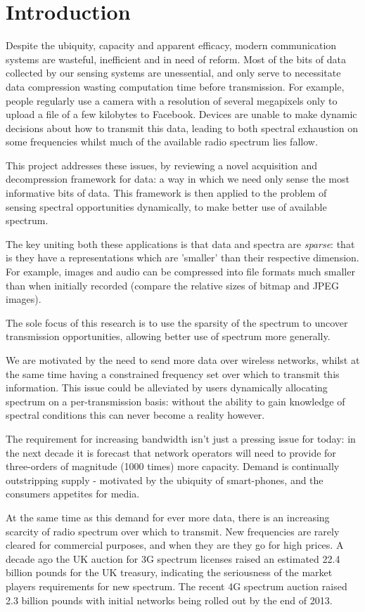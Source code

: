\section{Introduction}
Despite the ubiquity, capacity and apparent efficacy, modern communication systems are wasteful, inefficient and in need of reform. Most of the bits of data collected by our sensing systems are unessential, and only serve to necessitate data compression wasting computation time before transmission. For example, people regularly use a camera with a resolution of several megapixels only to upload a file of a few kilobytes to Facebook. Devices are unable to make dynamic decisions about how to transmit this data, leading to both spectral exhaustion on some frequencies whilst much of the available radio spectrum lies fallow. 

This project addresses these issues, by reviewing a novel acquisition and decompression framework for data: a way in which we need only sense the most informative bits of data. This framework is then applied to the problem of sensing spectral opportunities dynamically, to make better use of available spectrum. 

The key uniting both these applications is that data and spectra are \textit{sparse}: that is they have a representations which are 'smaller' than their respective dimension. For example, images and audio can be compressed into file formats much smaller than when initially recorded (compare the relative sizes of bitmap and JPEG images).

The sole focus of this research is to use the sparsity of the spectrum to uncover transmission opportunities, allowing better use of spectrum more generally. 

We are motivated by the need to send more data over wireless networks, whilst at the same time having a constrained frequency set over which to transmit this information. This issue could be alleviated by users dynamically allocating spectrum on a per-transmission basis: without the ability to gain knowledge of spectral conditions this can never become a reality however. 

The requirement for increasing bandwidth isn't just a pressing issue for today: in the next decade it is forecast that network operators will need to provide for three-orders of magnitude (1000 times) more capacity. Demand is continually outstripping supply - motivated by the ubiquity of smart-phones, and the consumers appetites for media. 

At the same time as this demand for ever more data, there is an increasing scarcity of radio spectrum over which to transmit. New frequencies are rarely cleared for commercial purposes, and when they are they go for high prices.  A decade ago the UK auction for 3G spectrum licenses raised an estimated 22.4 billion pounds for the UK treasury, indicating the seriousness of the market players requirements for new spectrum. The recent 4G spectrum auction raised 2.3 billion pounds with initial networks being rolled out by the end of 2013.

